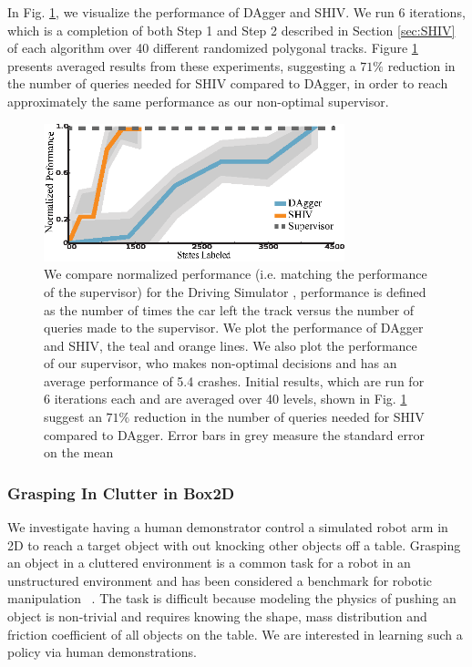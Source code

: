 \documentclass[10pt, conference]{ieeeconf}      %
\begin{document}
In Fig. \ref{fig:car_cost}, we visualize the performance of DAgger and SHIV.  We run 6 iterations, which is a completion of both Step 1 and Step 2 described in Section \ref{sec:SHIV} of each algorithm over 40 different
randomized polygonal tracks. Figure \ref{fig:car_cost} presents averaged
results from these experiments, suggesting a $71\%$ reduction in the number of queries needed for SHIV compared to DAgger, in order to reach approximately the same performance as our non-optimal supervisor.
 
\begin{figure}[t!]
\centering
\includegraphics[width=\columnwidth, height=4cm]{figures/dagger_shiv_one_class.eps}
\caption{We compare normalized performance (i.e. matching the performance of the supervisor) for the Driving Simulator , performance is defined as the number of times the car left the track versus the number of queries made to the supervisor. We plot the performance of DAgger and SHIV, the teal and orange lines. We also plot the performance of our supervisor, who makes non-optimal decisions and has an average performance of 5.4 crashes. Initial results, which are run for 6 iterations each and are averaged over 40 levels, shown in Fig. \ref{fig:car_cost} suggest an $71\%$ reduction in the number of queries needed for SHIV compared to DAgger. Error bars in grey measure the standard error on the mean}
\vspace*{-10pt}
\label{fig:car_cost}
\end{figure}


\subsubsection{Grasping In Clutter in Box2D}

We investigate having a human demonstrator control a simulated robot arm in 2D to reach a target object with out knocking other objects off a table. Grasping an object in a cluttered environment is a common task for a robot in an unstructured environment and has been considered a benchmark for robotic manipulation~ \cite{kitaevphysics,kingnonprehensile}. The task is difficult because modeling the physics of pushing an object is non-trivial and requires knowing the shape, mass distribution and friction coefficient of all objects on the table. We are interested in learning such a policy via human demonstrations. 
\end{document}
